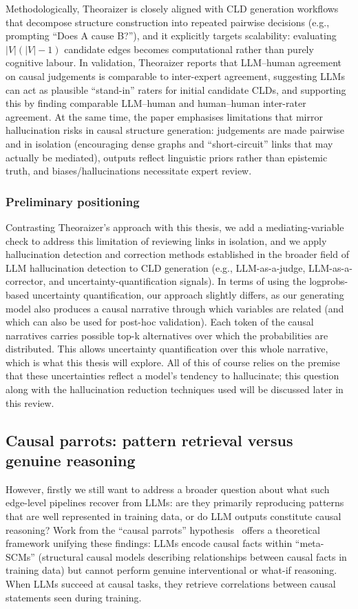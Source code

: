 Methodologically, Theoraizer is closely aligned with CLD generation workflows that decompose structure construction into repeated pairwise decisions (e.g., prompting ``Does A cause B?''), and it explicitly targets scalability: evaluating $|V|(|V|-1)$ candidate edges becomes computational rather than purely cognitive labour. In validation, Theoraizer reports that LLM--human agreement on causal judgements is comparable to inter-expert agreement, suggesting LLMs can act as plausible ``stand-in'' raters for initial candidate CLDs, and supporting this by finding comparable LLM--human and human--human inter-rater agreement. At the same time, the paper emphasises limitations that mirror hallucination risks in causal structure generation: judgements are made pairwise and in isolation (encouraging dense graphs and ``short-circuit'' links that may actually be mediated), outputs reflect linguistic priors rather than epistemic truth, and biases/hallucinations necessitate expert review.

\subsubsection{Preliminary positioning}

Contrasting Theoraizer's approach with this thesis, we add a mediating-variable check to address this limitation of reviewing links in isolation, and we apply hallucination detection and correction methods established in the broader field of LLM hallucination detection to CLD generation (e.g., LLM-as-a-judge, LLM-as-a-corrector, and uncertainty-quantification signals). In terms of using the logprobs-based uncertainty quantification, our approach slightly differs, as our generating model also produces a causal narrative through which variables are related (and which can also be used for post-hoc validation). Each token of the causal narratives carries possible top-k alternatives over which the probabilities are distributed. This allows uncertainty quantification over this whole narrative, which is what this thesis will explore. All of this of course relies on the premise that these uncertainties reflect a model's tendency to hallucinate; this question along with the hallucination reduction techniques used will be discussed later in this review.

\subsection{Causal parrots: pattern retrieval versus genuine reasoning}
However, firstly we still want to address a broader question about what such edge-level pipelines recover from LLMs: are they primarily reproducing patterns that are well represented in training data, or do LLM outputs constitute causal reasoning? Work from the ``causal parrots'' hypothesis~\citep{zecevic2023causalparrots} offers a theoretical framework unifying these findings: LLMs encode causal facts within ``meta-SCMs'' (structural causal models describing relationships between causal facts in training data) but cannot perform genuine interventional or what-if reasoning. When LLMs succeed at causal tasks, they retrieve correlations between causal statements seen during training.

